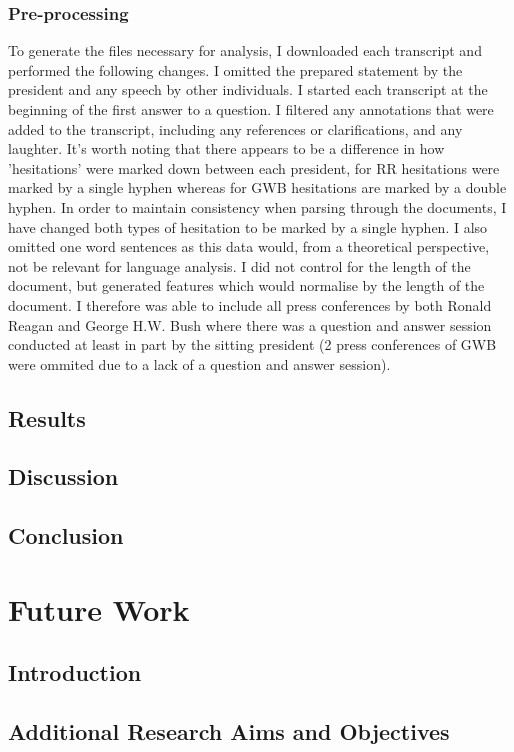 \documentclass[12pt, twoside, a4paper]{article}
\begin{document}
\subsubsection{Pre-processing}
To generate the files necessary for analysis, I downloaded each transcript and performed the following changes. I omitted the prepared statement by the president and any speech by other individuals. I started each transcript at the beginning of the first answer to a question. I filtered any annotations that were added to the transcript, including any references or clarifications, and any laughter. It's worth noting that there appears to be a difference in how 'hesitations' were marked down between each president, for RR hesitations were marked by a single hyphen whereas for GWB hesitations are marked by a double hyphen. In order to maintain consistency when parsing through the documents, I have changed both types of hesitation to be marked by a single hyphen. I also omitted one word sentences as this data would, from a theoretical perspective, not be relevant for language analysis. I did not control for the length of the document, but generated features which would normalise by the length of the document. I therefore was able to include all press conferences by both Ronald Reagan and George H.W. Bush where there was a question and answer session conducted at least in part by the sitting president (2 press conferences of GWB were ommited due to a lack of a question and answer session).
\subsection{Results}
\subsection{Discussion}
\subsection{Conclusion}



\section{Future Work}
\subsection{Introduction}

\subsection{Additional Research Aims and Objectives}
\end{document}
